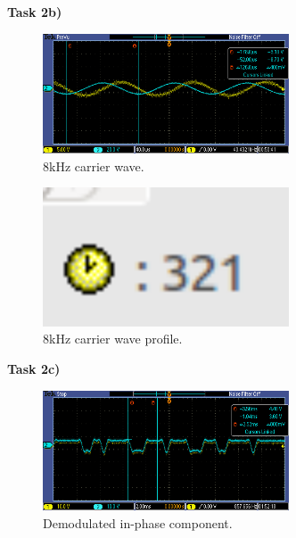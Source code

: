 \documentclass{article}
\begin{document}
\pagebreak
\textbf{Task 2b)}

\begin{figure}[h]
  \begin{center}
    \includegraphics[width=0.65\textwidth]{img/task_2_b_oscilloscope.png}
    \caption{8kHz carrier wave.}
  \end{center}
\end{figure}

\begin{figure}[h]
  \begin{center}
    \includegraphics[width=0.65\textwidth]{img/task_2_b_profile.png}
    \caption{8kHz carrier wave profile.}
  \end{center}
\end{figure}

\pagebreak
\textbf{Task 2c)}

\begin{figure}[h]
  \begin{center}
    \includegraphics[width=0.65\textwidth]{img/task_2_c_oscilloscope.png}
    \caption{Demodulated in-phase component.}
  \end{center}
\end{figure}
\end{document}
